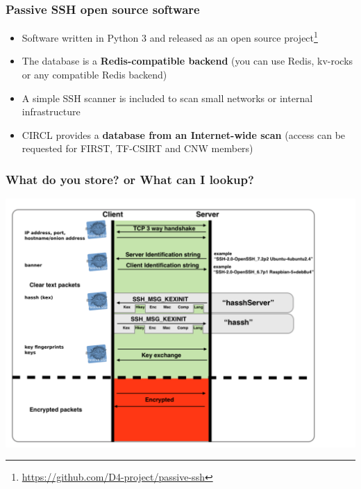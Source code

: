 \documentclass{beamer}
\begin{document}
\begin{frame}
        \frametitle{Passive SSH open source software}
        \begin{itemize}
                \item Software written in Python 3 and released as an open source project\footnote{\url{https://github.com/D4-project/passive-ssh}}
                \item The database is a {\bf Redis-compatible backend} (you can use Redis, kv-rocks or any compatible Redis backend)
                \item A simple SSH scanner is included to scan small networks or internal infrastructure
                \item CIRCL provides a {\bf database from an Internet-wide scan} (access can be requested for FIRST, TF-CSIRT and CNW members)
        \end{itemize}
\end{frame}

\begin{frame}
        \frametitle{What do you store? or What can I lookup?}
        \includegraphics[scale=0.3]{sshhandshake.png}
\end{frame}
\end{document}
